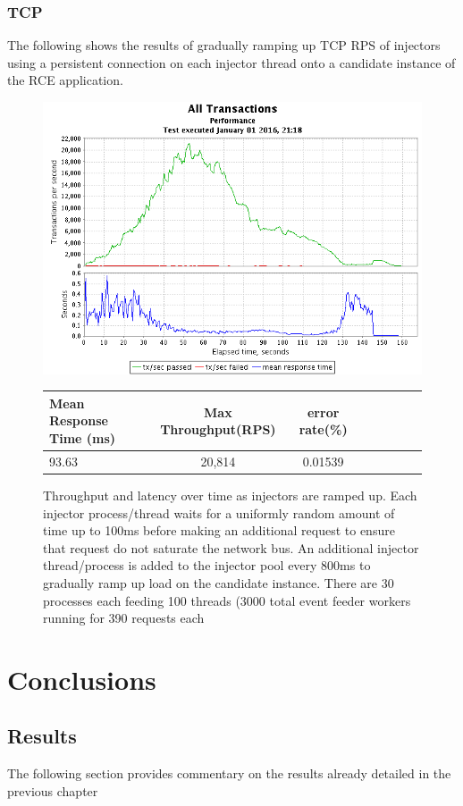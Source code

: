 \documentclass[a4paper,11pt]{scrreprt}
\begin{document}
\subsection{TCP}

The following shows the results of gradually ramping up TCP RPS of injectors using a persistent connection on each injector thread onto a candidate instance of the RCE application.
\begin{figure}[h!]
\centering
\caption{Throughput and latency over time as injectors are ramped up. Each injector process/thread waits for a uniformly random amount of time up to 100ms before making an additional request to ensure that request do not saturate the network bus. An additional injector thread/process is added to the injector pool every 800ms to gradually ramp up load on the candidate instance. There are 30 processes each feeding 100 threads (3000 total event feeder workers running for 390 requests each}
\includegraphics[scale=0.6, trim=0 -25 0 2, clip=true] {TCP_throughput.png}
\label{fig:udpthroughput}
\begin{tabular}{l*{6}{c}r}
Mean Response Time (ms) & Max Throughput(RPS) & error rate(\%)\\
\hline
93.63 & 20,814 & 0.01539
\end{tabular}
\end{figure}
\clearpage

\chapter{Conclusions}
\section{Results}
The following section provides commentary on the results already detailed in the previous chapter
\end{document}
